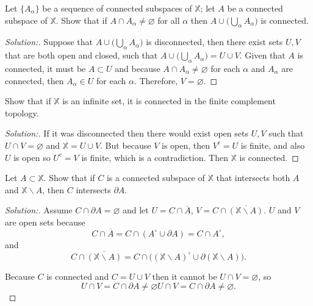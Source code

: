 \documentclass[a4paper,12pt, reqno]{article}
\theoremstyle{definition}
\newenvironment{exerr}[1]{
  \renewcommand\theexeralt{#1}
  \exeralt
}{\endexeralt}
\newenvironment{solution}{\begin{proof}[Solution:]}{\end{proof}}
\newcommand{\X}{\mathbb{X}}
\begin{document}
\begin{exerr}{3}
  Let $\{ A_{\alpha} \}$ be a sequence of connected subspaces of $\X$; let $A$ be a connected subspace of $\X$. Show that if $A\cap A_{\alpha}\neq \varnothing$ for all $\alpha$ then $A\cup\big( \bigcup_{\alpha}A_{\alpha} \big)$ is connected.
\end{exerr}
\begin{solution}
  Suppose that $A\cup\big( \bigcup_{\alpha}A_{\alpha} \big)$ is disconnected, then there exist sets $U,V$ that are both open and closed, such that $A\cup\big( \bigcup_{\alpha}A_{\alpha} \big) = U\cup V$. Given that $A$ is connected, it must be $A\subset U$ and because $A\cap A_{\alpha}\neq \varnothing$ for each $\alpha$ and $A_{\alpha}$ are connected, then $A_{\alpha}\in U$ for each $\alpha$. Therefore, $V=\varnothing$.
\end{solution}

\begin{exerr}{4}
  Show that if $\X$ is an infinite set, it is connected in the finite complement topology.
\end{exerr}
\begin{solution}
  If it was disconnected then there would exist open sets $U,V$ such that $U\cap V = \varnothing$ and $\X = U\cup V$. But because $V$ is open, then $V^c = U$ is finite, and also $U$ is open so $U^c = V$ is finite, which is a contradiction. Then $\X$ is connected.
\end{solution}

\begin{exerr}{6}
  Let $A\subset\X$. Show that if $C$ is a connected subspace of $\X$ that intersects both $A$ and $\X\backslash A$, then $C$ intersects $\partial A$.
\end{exerr}
\begin{solution}
  Assume $C\cap\partial A=\varnothing$ and let $U = C\cap \overline{A}$, $V = C\cap\overline{(\X\backslash A)}$. $U$ and $V$ are open sets because
  \begin{equation*}
    C\cap \overline{A} = C\cap(A^\circ\cup\partial A) = C\cap A^\circ,
  \end{equation*}
  and
  \begin{equation*}
      C\cap\overline{(\X\backslash A)} = C\cap\big( (\X\backslash A)^\circ \cup \partial(\X\backslash A) \big).
  \end{equation*}
  
  Because $C$ is connected and $C = U\cup V$ then it cannot be $U\cap V = \varnothing$, so
  \begin{equation*}
      U\cap V = C\cap\partial A \neq \varnothing U\cap V = C\cap\partial A \neq \varnothing.
  \end{equation*}
\end{solution}
\end{document}

